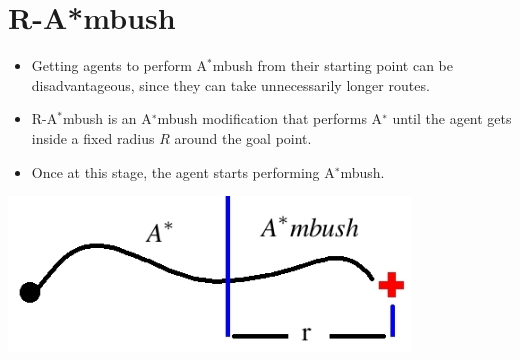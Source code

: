 \begin{minipage}{0.3\textwidth}
\section*{R-A*mbush}

\begin{itemize}
\item Getting agents to perform A$^*$mbush from their
starting point can be disadvantageous, since they can
take unnecessarily longer routes.

\item R-A$^*$mbush is an A$^∗$mbush modification that
performs A$^∗$ until the agent gets inside a fixed radius
$R$ around the goal point.

\item Once at this stage, the agent starts performing A$^∗$mbush.

\end{itemize}

\begin{center}
\includegraphics[width=0.8\textwidth]{figures/rambush.jpg}
\end{center}
\end{minipage}